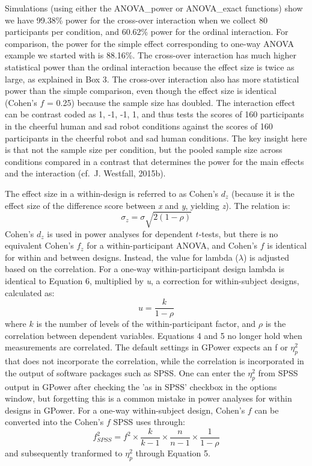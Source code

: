 \documentclass[
  ,jou,floatsintext]{apa6}
\begin{document}
Simulations (using either the ANOVA\_power or ANOVA\_exact functions) show we have 99.38\% power for the cross-over interaction when we collect 80 participants per condition, and 60.62\% power for the ordinal interaction.
For comparison, the power for the simple effect corresponding to one-way ANOVA example we started with is 88.16\%.
The cross-over interaction has much higher statistical power than the ordinal interaction because the effect size is twice as large, as explained in Box 3.
The cross-over interaction also has more statistical power than the simple comparison, even though the effect size is identical (Cohen's \(f\) = 0.25) because the sample size has doubled.
The interaction effect can be contrast coded as 1, -1, -1, 1, and thus tests the scores of 160 participants in the cheerful human and sad robot conditions against the scores of 160 participants in the cheerful robot and sad human conditions.
The key insight here is that not the sample size per condition, but the pooled sample size across conditions compared in a contrast that determines the power for the main effects and the interaction (cf.~J. Westfall, 2015b).

\begin{tcolorbox}[colback=black!5!white,colframe=white!5!black,title=Box 2. Formula for effect sizes for within designs]
The effect size in a within-design is referred to as Cohen's $d_z$ (because it is the effect size of the difference score between \emph{x} and \emph{y}, yielding \emph{z}). The relation is:
\begin{equation}
\sigma_{z}=\sigma\sqrt{2(1-\rho)}
\end{equation}
Cohen's $d_z$ is used in power analyses for dependent $t$-tests, but there is no equivalent Cohen's $f_z$ for a within-participant ANOVA, and Cohen's $f$ is identical for within and between designs. 
Instead, the value for lambda ($\lambda$) is adjusted based on the correlation. 
For a one-way within-participant design lambda is identical to Equation 6, multiplied by \textit{u}, a correction for within-subject designs, calculated as:
\begin{equation}
u = \frac{k}{1-\rho}
\end{equation}
where $k$ is the number of levels of the within-participant factor, and $\rho$ is the correlation between dependent variables.
Equations 4 and 5 no longer hold when measurements are correlated.
The default settings in G\*Power expects an f or $\eta_p^2$ that does not incorporate the correlation, while the correlation is incorporated in the output of software packages such as SPSS. 
One can  enter the $\eta_p^2$ from SPSS output in G\*Power after checking the 'as in SPSS' checkbox in the options window, but forgetting this is a common mistake in power analyses for within designs in G\*Power.
For a one-way within-subject design, Cohen's $f$ can be converted into the Cohen's $f$ SPSS uses through:
\begin{equation}
f^2_{SPSS} = f^2 \times \frac{k}{k-1} \times \frac{n}{n-1} \times \frac{1}{1-\rho}
\end{equation}
and subsequently tranformed to $\eta_p^2$ through Equation 5.
\end{tcolorbox}
\end{document}
